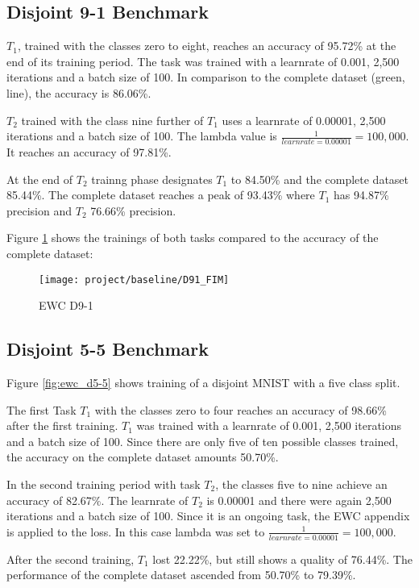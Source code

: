 \subsection{Disjoint 9-1 Benchmark}

$T_1$, trained with the classes zero to eight, reaches an accuracy of 95.72\% at the end of its training period.
The task was trained with a learnrate of 0.001, 2,500 iterations and a batch size of 100.
In comparison to the complete dataset (green, line), the accuracy is 86.06\%.

$T_2$ trained with the class nine further of $T_1$ uses a learnrate of 0.00001, 2,500 iterations and a batch size of 100.
The lambda value is $\frac{1}{learnrate = 0.00001} = 100,000$.
It reaches an accuracy of 97.81\%.

At the end of $T_2$ trainng phase designates $T_1$ to 84.50\% and the complete dataset 85.44\%.
The complete dataset reaches a peak of 93.43\% where $T_1$ has 94.87\% precision and $T_2$ 76.66\% precision.

Figure \ref{fig:ewc_d9-1} shows the trainings of both tasks compared to the accuracy of the complete dataset:

\begin{figure}[H]
    \centering
    \texttt{[image: project/baseline/D91\_FIM]}
    \caption{EWC D9-1}
    \label{fig:ewc_d9-1}
\end{figure}

\subsection{Disjoint 5-5 Benchmark}

Figure \ref{fig:ewc_d5-5} shows training of a disjoint MNIST with a five class split.

The first Task $T_1$ with the classes zero to four reaches an accuracy of 98.66\% after the first training.
$T_1$ was trained with a learnrate of 0.001, 2,500 iterations and a batch size of 100.
Since there are only five of ten possible classes trained, the accuracy on the complete dataset amounts 50.70\%.

In the second training period with task $T_2$, the classes five to nine achieve an accuracy of 82.67\%.
The learnrate of $T_2$ is 0.00001 and there were again 2,500 iterations and a batch size of 100.
Since it is an ongoing task, the EWC appendix is applied to the loss.
In this case lambda was set to $\frac{1}{learnrate = 0.00001} = 100,000$.

After the second training, $T_1$ lost 22.22\%, but still shows a quality of 76.44\%.
The performance of the complete dataset ascended from 50.70\% to 79.39\%.


